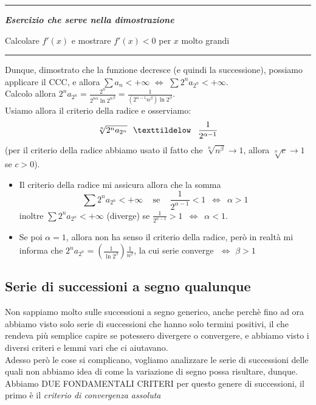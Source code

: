\documentclass{article}
\theoremstyle{definition}
\begin{document}
\vspace{15pt}
\hrule
\vspace{15pt}
\begin{center}
    \textbf{\textit{Esercizio che serve nella dimostrazione}}
\end{center}
Calcolare $f'(x)$ e mostrare $f'(x) < 0$ per $x$ molto grandi
\vspace{15pt}
\hrule
\vspace{15pt}
Dunque, dimostrato che la funzione decresce (e quindi la successione), possiamo applicare il CCC, e allora $\sum a_n < +\infty \,\, \Longleftrightarrow \,\, \sum 2^n a_{2^n} < +\infty$.
\\
Calcolo allora $2^na_{2^n}=\frac{2^n}{2^{n\alpha}\ln{2^n}^\beta}=\frac{1}{(2^{\alpha-1}n^\beta) \ln{2}^\beta}$.
\\
Usiamo allora il criterio della radice e osserviamo:
\begin{equation*}
    \sqrt[n]{2^na_{2^n}} \,\,\,\,\texttildelow \,\,\,\,\, \frac{1}{2^{\alpha - 1}}
\end{equation*}
(per il criterio della radice abbiamo usato il fatto che $\sqrt[n]{n^\beta} \to 1$, allora $\sqrt[n]{c} \to 1$ se $c > 0$).
\\
\begin{itemize}
\item Il criterio della radice mi assicura allora che la somma
\begin{equation*}
    \sum 2^n a_{2^n} < +\infty \,\,\,\,\,\,\, \mbox{se} \,\,\,\,\,\,\, \frac{1}{2^{\alpha -1 }} < 1 \,\,\, \Longleftrightarrow \,\,\, \alpha > 1
\end{equation*}
inoltre $\sum 2^n a_{2^n} < +\infty $ (diverge) se $\frac{1}{2^{\alpha -1 }} > 1 \,\,\, \Longleftrightarrow \,\,\, \alpha < 1$.
\item Se poi $\alpha= 1$, allora non ha senso il criterio della radice, però in realtà mi informa che $2^n a_{2^n}=\left(\frac{1}{\ln{2}^\beta}\right)\frac{1}{n^\beta}$, la cui serie converge $\,\, \Longleftrightarrow \,\, \beta > 1$
\end{itemize}
\subsection{Serie di successioni a segno qualunque}
Non sappiamo molto sulle successioni a segno generico, anche perchè fino ad ora abbiamo visto solo serie di successioni che hanno solo termini positivi, il che rendeva più semplice capire se potessero divergere o convergere, e abbiamo visto i diversi criteri e lemmi vari che ci aiutavano.
\\
Adesso però le cose si complicano, vogliamo analizzare le serie di successioni delle quali non abbiamo idea di come la variazione di segno possa risultare, dunque.
\\
Abbiamo DUE FONDAMENTALI CRITERI per questo genere di successioni, il primo è il \textit{criterio di convergenza assoluta}
\end{document}

